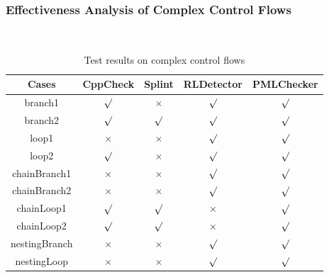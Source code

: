 \subsubsection{Effectiveness Analysis of Complex Control Flows}

\

\begin{table}[!h]
\center
\caption{Test results on complex control flows}\label{tab:7}
\begin{tabular}{|c|c|c|c|c|}
\hline
\textbf{Cases}  & \textbf{CppCheck} & \textbf{Splint} & \textbf{RLDetector} & \textbf{PMLChecker}\\
\hline
branch1	 &$\surd$ & $\times$ & $\surd$ & $\surd$\\
\hline
branch2    & $\surd$ & $\surd$ & $\surd$ & $\surd$\\
\hline
loop1	 &$\times$ &	$\times$ & $\surd$ & $\surd$\\
\hline
loop2    & $\surd$ &$\times$ & $\surd$ & $\surd$\\
\hline
chainBranch1 & $\times$ & $\times$ & $\surd$ & $\surd$\\
\hline
chainBranch2 &	$\times$	& $\times$ & $\surd$ & $\surd$\\
\hline
chainLoop1	 & $\surd$ & $\surd$ & $\times$ & $\surd$\\
\hline
chainLoop2	 & $\surd$& $\surd$ & $\times$ & $\surd$\\
\hline
nestingBranch	 & $\times$ & $\times$ & $\surd$ & $\surd$\\
\hline
nestingLoop& $\times$ & $\times$ & $\surd$ & $\surd$\\
\hline
\end{tabular}
\end{table}




